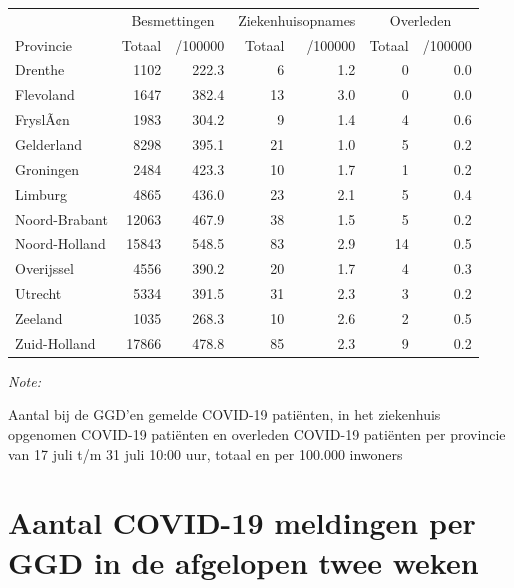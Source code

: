 \documentclass[
  english,
  man,floatsintext]{apa6}
\begin{document}
\begin{table}
\centering
\begin{threeparttable}
\begin{tabular}{lrrrrrr}
\toprule
\multicolumn{1}{c}{ } & \multicolumn{2}{c}{Besmettingen} & \multicolumn{2}{c}{Ziekenhuisopnames} & \multicolumn{2}{c}{Overleden} \\
\cmidrule(l{3pt}r{3pt}){2-3} \cmidrule(l{3pt}r{3pt}){4-5} \cmidrule(l{3pt}r{3pt}){6-7}
Provincie & Totaal & /100000 & Totaal & /100000 & Totaal & /100000\\
\midrule
Drenthe & 1102 & 222.3 & 6 & 1.2 & 0 & 0.0\\
Flevoland & 1647 & 382.4 & 13 & 3.0 & 0 & 0.0\\
FryslÃ¢n & 1983 & 304.2 & 9 & 1.4 & 4 & 0.6\\
Gelderland & 8298 & 395.1 & 21 & 1.0 & 5 & 0.2\\
Groningen & 2484 & 423.3 & 10 & 1.7 & 1 & 0.2\\
Limburg & 4865 & 436.0 & 23 & 2.1 & 5 & 0.4\\
Noord-Brabant & 12063 & 467.9 & 38 & 1.5 & 5 & 0.2\\
Noord-Holland & 15843 & 548.5 & 83 & 2.9 & 14 & 0.5\\
Overijssel & 4556 & 390.2 & 20 & 1.7 & 4 & 0.3\\
Utrecht & 5334 & 391.5 & 31 & 2.3 & 3 & 0.2\\
Zeeland & 1035 & 268.3 & 10 & 2.6 & 2 & 0.5\\
Zuid-Holland & 17866 & 478.8 & 85 & 2.3 & 9 & 0.2\\
\bottomrule
\end{tabular}
\begin{tablenotes}
\item \textit{Note: } 
\item Aantal bij de GGD’en gemelde COVID-19 patiënten, in het ziekenhuis opgenomen COVID-19 patiënten en overleden COVID-19 patiënten per provincie van 17 juli t/m 31 juli 10:00 uur, totaal en per 100.000 inwoners
\end{tablenotes}
\end{threeparttable}
\end{table}

\newpage

\hypertarget{aantal-covid-19-meldingen-per-ggd-in-de-afgelopen-twee-weken}{%
\section{Aantal COVID-19 meldingen per GGD in de afgelopen twee weken}\label{aantal-covid-19-meldingen-per-ggd-in-de-afgelopen-twee-weken}}
\end{document}
